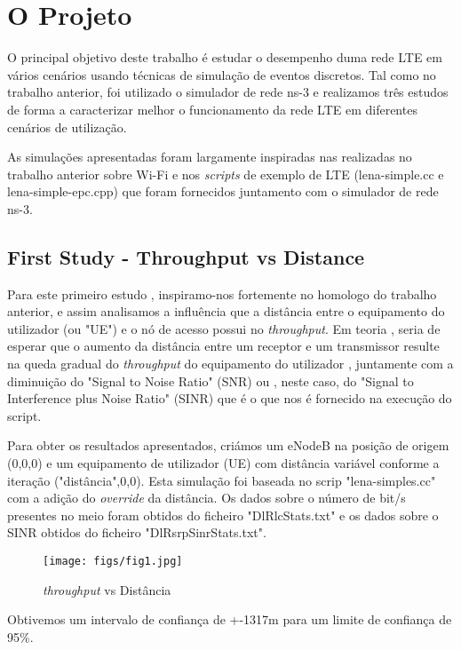 \chapter{O Projeto} \label{int}
    O principal objetivo deste trabalho é estudar o desempenho duma rede LTE em vários cenários usando técnicas de
simulação de eventos discretos. Tal como no trabalho anterior, foi utilizado o simulador de rede ns-3 e realizamos três
estudos de forma a caracterizar melhor o funcionamento da rede LTE em diferentes cenários de utilização.

As simulações apresentadas foram largamente inspiradas nas realizadas no trabalho anterior sobre Wi-Fi e nos \textit{scripts}
de exemplo de LTE (lena-simple.cc e lena-simple-epc.cpp) que foram fornecidos juntamento com o simulador de rede ns-3.



\section{First Study - Throughput vs Distance} \label{ex1}
    Para este primeiro estudo , inspiramo-nos fortemente no homologo do trabalho anterior, e assim analisamos
a influência que a distância entre o equipamento do utilizador (ou "UE") e o nó de acesso possui no
\textit{throughput}.
Em teoria , seria de esperar que o aumento da distância entre um receptor e um transmissor resulte na queda gradual
do \textit{throughput} do equipamento do utilizador , juntamente com a diminuição do "Signal to Noise Ratio" (SNR) ou , neste caso,
do "Signal to Interference plus Noise Ratio" (SINR) que é o que nos é fornecido na execução do script.

Para obter os resultados apresentados, criámos um eNodeB na posição de origem (0,0,0) e um equipamento de utilizador (UE) com distância 
variável conforme a iteração ("distância",0,0). Esta simulação foi baseada no scrip "lena-simples.cc" com a adição do \textit{override} da distância. Os dados
sobre o número de bit/s presentes no meio foram obtidos do ficheiro "DlRlcStats.txt" e os dados sobre o SINR obtidos do ficheiro "DlRsrpSinrStats.txt".


\begin{figure}[H]
    \centering
    \texttt{[image: figs/fig1.jpg]}
    \caption{\textit{throughput} vs Distância}
    \label{fig:1}
\end{figure}

Obtivemos um intervalo de confiança de +-1317m para um limite de confiança de 95\%.

